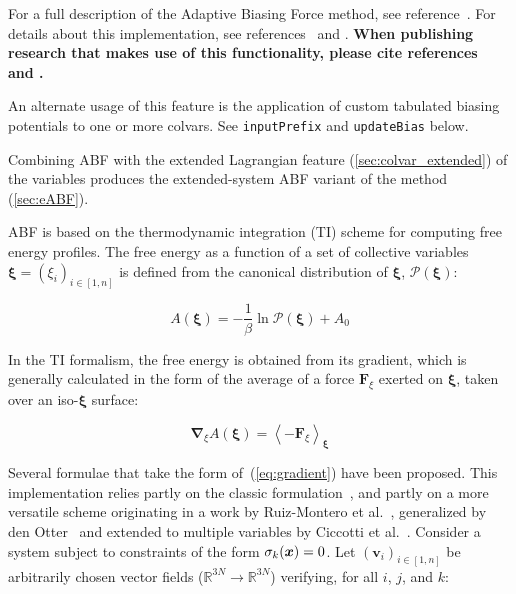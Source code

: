 
For a full description of the Adaptive Biasing Force method, see
reference~\cite{Darve2008}. For details about this implementation,
see references~\cite{Henin2004} and \cite{Henin2010}. \textbf{When
publishing research that makes use of this functionality, please cite
references~\cite{Darve2008} and \cite{Henin2010}.}

An alternate usage of this feature is the application of custom
tabulated biasing potentials to one or more colvars. See
\texttt{inputPrefix} and \texttt{updateBias} below.

Combining ABF with the extended Lagrangian feature (\ref{sec:colvar_extended})
of the variables produces the extended-system ABF variant of the method
(\ref{sec:eABF}).

ABF is based on the thermodynamic integration (TI) scheme for
computing free energy profiles. The free energy as a function
of a set of collective variables $\bm{\xi}=(\xi_{i})_{i\in[1,n]}$
is defined from the canonical distribution of $\bm{\xi}$, ${\mathcal P}(\bm{\xi})$:

\begin{equation}
  \label{eq:free}
  A\left(\bm{\xi}\right) = -\frac{1}{\beta} \ln {\mathcal P}(\bm{\xi}) + A_0
\end{equation}

In the TI formalism, the free energy is obtained from its gradient,
which is generally calculated in the form of the average of a force
$\bm{F}_\xi$ exerted on $\bm{\xi}$, taken over an iso-$\bm{\xi}$ surface:

\begin{equation}
  \label{eq:gradient}
  \bm{\nabla}_\xi A\left(\bm{\xi}\right) = \left\langle -\bm{F}_\xi \right\rangle_{\bm{\xi}}
\end{equation}

Several formulae that take the form of~(\ref{eq:gradient}) have been
proposed.  This implementation relies partly on the classic
formulation~\cite{Carter1989}, and partly on a more versatile scheme
originating in a work by Ruiz-Montero et al.~\cite{Ruiz-Montero1997},
generalized by den Otter~\cite{denOtter2000} and extended to multiple
variables by Ciccotti et al.~\cite{Ciccotti2005}.  Consider a system
subject to constraints of the form $\sigma_{k}({\mbox{\boldmath{$x$}}}) = 0$.  Let
$(\bm{v}_{i})_{i\in[1,n]}$ be arbitrarily chosen vector fields
($\mathbb{R}^{3N}\rightarrow\mathbb{R}^{3N}$) verifying, for all $i$,
$j$, and $k$:

